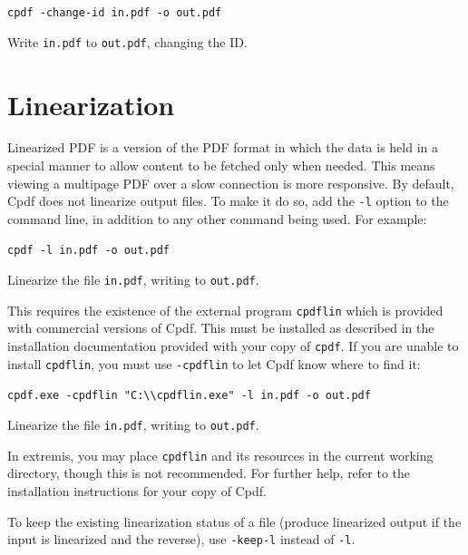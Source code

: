 \documentclass{book}
\begin{document}
\begin{framed}
\noindent\small\verb!cpdf -change-id in.pdf -o out.pdf!

\vspace{2.5mm}
\noindent Write \texttt{in.pdf} to \texttt{out.pdf}, changing the ID.
\end{framed}

\section{Linearization}
Linearized PDF is a version of the PDF format in which the data is held in a
special manner to allow content to be fetched only when needed. This means
viewing a multipage PDF over a slow connection is more responsive. By default,
Cpdf does not linearize output files. To make it do so, add the \texttt{-l}
option to the command line, in addition to any other command being used. For example:

\begin{framed}
\noindent\small\verb!cpdf -l in.pdf -o out.pdf!

\vspace{2.5mm}
\noindent Linearize the file \texttt{in.pdf}, writing to \texttt{out.pdf}.
\end{framed}

\noindent This requires the existence of the external program \texttt{cpdflin} which is provided with commercial versions of Cpdf. This must be installed as described in the installation documentation provided with your copy of \texttt{cpdf}. If you are unable to install \texttt{cpdflin}, you must use \texttt{-cpdflin} to let Cpdf know where to find it:

\begin{framed}
\noindent\small\verb!cpdf.exe -cpdflin "C:\\cpdflin.exe" -l in.pdf -o out.pdf!

\vspace{2.5mm}
\noindent Linearize the file \texttt{in.pdf}, writing to \texttt{out.pdf}.
\end{framed}

\noindent In extremis, you may place \texttt{cpdflin} and its resources in the current working directory, though this is not recommended. For further help, refer to the installation instructions for your copy of Cpdf.

To keep the existing linearization status of a file (produce linearized output if the input is linearized and the reverse), use \texttt{-keep-l} instead of \texttt{-l}.
\end{document}
